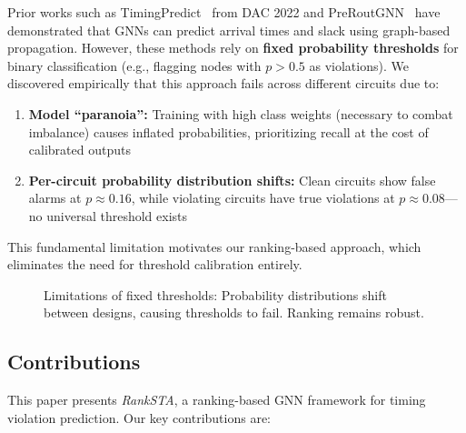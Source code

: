 \documentclass[10pt,twocolumn,journal]{IEEEtran}
\begin{document}
Prior works such as TimingPredict~\cite{guo2022timingpredict} from DAC 2022 and PreRoutGNN~\cite{zhong2024preroutgnn} have demonstrated that GNNs can predict arrival times and slack using graph-based propagation. However, these methods rely on \textbf{fixed probability thresholds} for binary classification (e.g., flagging nodes with $p > 0.5$ as violations). We discovered empirically that this approach fails across different circuits due to:
\begin{enumerate}
    \item \textbf{Model ``paranoia'':} Training with high class weights (necessary to combat imbalance) causes inflated probabilities, prioritizing recall at the cost of calibrated outputs
    \item \textbf{Per-circuit probability distribution shifts:} Clean circuits show false alarms at $p \approx 0.16$, while violating circuits have true violations at $p \approx 0.08$---no universal threshold exists
\end{enumerate}

This fundamental limitation motivates our ranking-based approach, which eliminates the need for threshold calibration entirely.

\begin{figure}[t]
\centering
{}
\caption{Limitations of fixed thresholds: Probability distributions shift between designs, causing thresholds to fail. Ranking remains robust.}
\label{fig:threshold_vs_ranking}
\end{figure}

\subsection{Contributions}

This paper presents \textit{RankSTA}, a ranking-based GNN framework for timing violation prediction. Our key contributions are:
\end{document}

